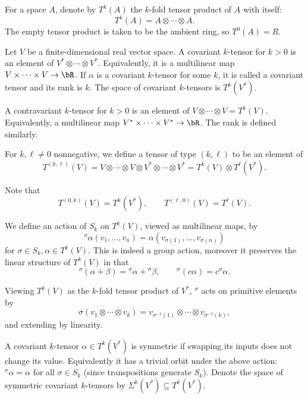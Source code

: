 \bdefn

    For a space $A$, denote by $T^k(A)$ the $k$-fold tensor product of $A$ with itself:
    $$ T^k(A) = A\otimes\cdots\otimes A . $$
    The empty tensor product is taken to be the ambient ring, so $T^0(A)=R$.

\edefn

\bdefn

    Let $V$ be a finite-dimensional real vector space.
    A {\emphcolor covariant $k$-tensor} for $k>0$ is an element of $V^*\otimes\cdots\otimes V^*$.
    Equivalently, it is a multilinear map $V\times\cdots\times V\to\bR$.
    If $\alpha$ is a covariant $k$-tensor for some $k$, it is called a {\emphcolor covariant tensor} and its {\emphcolor rank} is $k$.
    The space of covariant $k$-tensors is $T^k(V^*)$.

    A {\emphcolor contravariant $k$-tensor} for $k>0$ is an element of $V\otimes\cdots\otimes V=T^k(V)$.
    Equivalently, a multilinear map $V^*\times\cdots\times V^*\to\bR$.
    The rank is defined similarly.

    For $k,\ell\neq0$ nonnegative, we define a {\emphcolor tensor of type $(k,\ell)$} to be an element of
    $$ T^{(k,\ell)}(V) = V\otimes\cdots\otimes V\otimes V^*\otimes\cdots\otimes V^* = T^k(V) \otimes T^\ell(V^*) . $$

\edefn

Note that
$$ T^{(0,k)}(V) = T^k(V^*),\qquad T^{(\ell,0)}(V) = T^\ell(V) . $$

\bdefn

    We define an action of $S_k$ on $T^k(V)$, viewed as multilinear maps, by
    $$ {}^\sigma\alpha(v_1,\dots,v_n) = \alpha(v_{\sigma(1)},\dots,v_{\sigma(n)}) $$
    for $\sigma\in S_k,\alpha\in T^k(V)$.
    This is indeed a group action, moreover it preserves the linear structure of $T^k(V)$ in that
    $$ {}^\sigma(\alpha+\beta) = {}^\sigma\alpha + {}^\sigma\beta,\qquad {}^\sigma(c\alpha) = c{}^\sigma\alpha . $$

\edefn

Viewing $T^k(V)$ as the $k$-fold tensor product of $V^*$, ${}^\sigma$ acts on primitive elements by
$$ \sigma(v_1\otimes\cdots\otimes v_k) = v_{\sigma^{-1}(1)}\otimes\cdots\otimes v_{\sigma^{-1}(k)} , $$
and extending by linearity.

\bdefn

    A covariant $k$-tensor $\alpha\in T^k(V^*)$ is {\emphcolor symmetric} if swapping its inputs does not change its value.
    Equivalently it has a trivial orbit under the above action: ${}^\sigma\alpha=\alpha$ for all $\sigma\in S_k$ (since transpositions
    generate $S_k$).
    Denote the space of symmetric covariant $k$-tensors by $\Sigma^k(V^*)\subseteq T^k(V^*)$.

